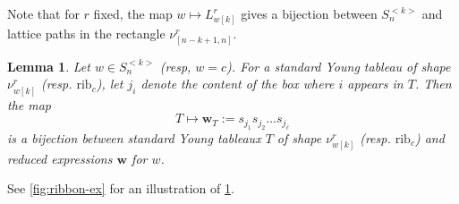 \documentclass[11pt]{amsart}
\newtheorem{lemma}[Thm]{Lemma}
\theoremstyle{definition}
\def\pbolic^#1{^{<#1>}}
\def\bw{\mathbf{w}}
\def\rib_#1{\mathrm{rib}_{#1}}
\def\path{L}
\def\skew{\nu}
\begin{document}
Note that for $r$ fixed, the map $w \mapsto \path_{w[k]}^r$ gives a bijection between $S_n\pbolic^{k}$ and lattice paths in the rectangle $\skew_{[n-k+1, n]}^r$.

\begin{lemma}\label{lem:SYT-red-expr-bij}
	Let $w \in S_n\pbolic^{k}$ (resp, $w=c$). For a standard Young tableau of shape $\skew_{w[k]}^r$ (resp. $\rib_c$), let $j_i$ denote the content of the box where $i$ appears in $T$. Then the map 
	\[T \mapsto \bw_T:=s_{j_1} s_{j_2} \dots s_{j_\ell} \]
	is a bijection between standard Young tableaux $T$ of shape $\skew_{w[k]}^r$ (resp. $\rib_c$) and reduced expressions $\bw$ for $w$. 
\end{lemma}

See \cref{fig:ribbon-ex} for an illustration of \cref{lem:SYT-red-expr-bij}.
\end{document}
